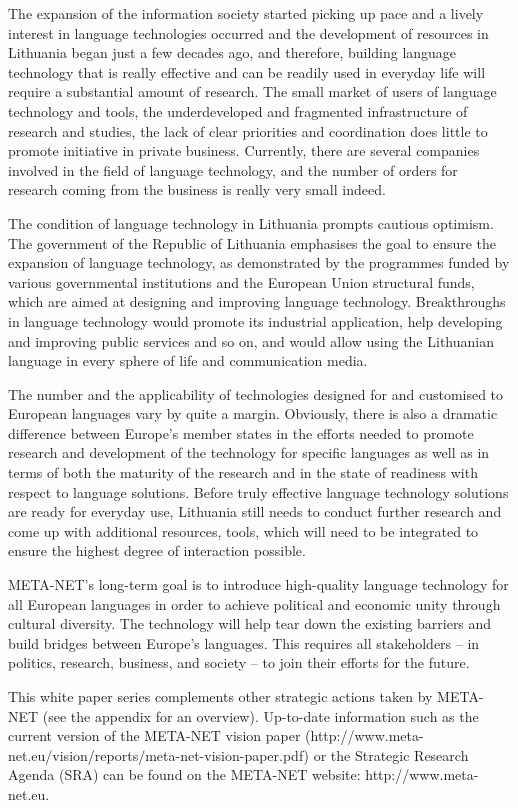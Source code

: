 \begin{multicols}{2}
The expansion of the information society started picking up pace and a lively interest in language technologies occurred and the development of resources in Lithuania began just a few decades ago, and therefore, building language technology that is really effective and can be readily used in everyday life will require a substantial amount of research. The small market of users of language technology and tools, the underdeveloped and fragmented infrastructure of research and studies, the lack of clear priorities and coordination does little to promote initiative in private business. Currently, there are several companies involved in the field of language technology, and the number of orders for research coming from the business is really very small indeed.

The condition of language technology in Lithuania prompts cautious optimism. The government of the Republic of Lithuania emphasises the goal to ensure the expansion of language technology, as demonstrated by the programmes funded by various governmental institutions and the European Union structural funds, which are aimed at designing and improving language technology. Breakthroughs in language technology would promote its industrial application, help developing and improving public services and so on, and would allow using the Lithuanian language in every sphere of life and communication media.


The number and the applicability of technologies designed for and customised to European languages vary by quite a margin. Obviously, there is also a dramatic difference between Europe’s member states in the efforts needed to promote research and development of the technology for specific languages as well as in terms of both the maturity of the research and in the state of readiness with respect to language solutions. Before truly effective language technology solutions are ready for everyday use, Lithuania still needs to conduct further research and come up with additional resources, tools, which will need to be integrated to ensure the highest degree of interaction possible.

META-NET’s long-term goal is to introduce high-quality language technology for all European languages in order to achieve political and economic unity through cultural diversity. The technology will help tear down the existing barriers and build bridges between Europe’s languages. This requires all stakeholders – in politics, research, business, and society – to join their efforts for the future.

This white paper series complements other strategic actions taken by META-NET (see the appendix for an overview). Up-to-date information such as the current version of the META-NET vision paper (http://www.meta-net.eu/vision/reports/meta-net-vision-paper.pdf) or the Strategic Research Agenda (SRA) can be found on the META-NET website: http://www.meta-net.eu.
\end{multicols}


